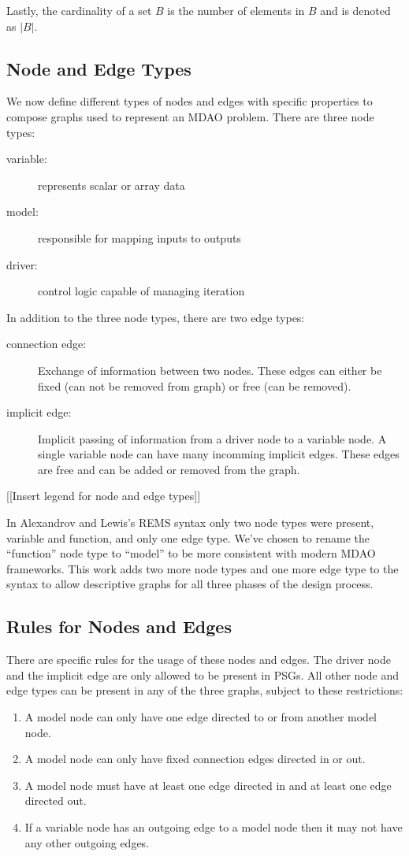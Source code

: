Lastly, the cardinality of a set $B$ is the number of elements in $B$ and is denoted as $|B|$.


\subsection{Node and Edge Types}
We now define different types of nodes and edges with specific properties to compose graphs used to represent an MDAO problem. 
There are three node types:  
\begin{description}
\item[variable: ] represents scalar or array data
\item[model:] responsible for mapping inputs to outputs
\item[driver:] control logic capable of managing iteration
\end{description}

In addition to the three node types, there are two edge types: 

\begin{description}
\item[connection edge:] Exchange of information between two nodes. These edges 
can either be fixed (can not be removed from graph) or free (can be removed). 
\item [implicit edge:] Implicit passing of information from a driver node to a 
  variable node. A single variable node can have many incomming implicit edges. These edges are 
  free and can be added or removed from the graph. 
\end{description}

[[Insert legend for node and edge types]]

In Alexandrov and Lewis's REMS syntax only two node types were present, variable 
and function, and only one edge type\cite{alexandrov2004}. We've chosen to rename the ``function'' node 
type to ``model'' to be more consistent with modern MDAO frameworks. This work 
adds two more node types and one more edge type to the syntax to allow descriptive
graphs for all three phases of the design process. 

\subsection{Rules for Nodes and Edges}
There are specific rules for the usage of these nodes and edges.
The driver node and the implicit edge are only allowed to be present in PSGs. All 
other node and edge types can be present in any of the three graphs, subject to these restrictions: 
\begin{enumerate}
\item A model node can only have one edge directed to or from another model node.
\item A model node can only have fixed connection edges directed in or out.
\item A model node must have at least one edge directed in and at least one edge 
  directed out.
\item If a variable node has an outgoing edge to a model node then it may not have 
  any other outgoing edges.
\end{enumerate}

